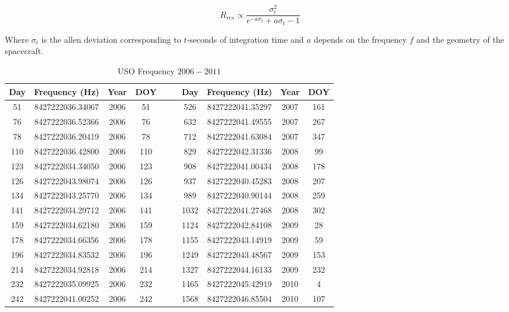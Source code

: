\documentclass{article}
\theoremstyle{mystyle}
\begin{document}
\begin{equation}
    R_{res} \propto \frac{\sigma_{t}^2}{e^{-a\sigma_{t}} +a\sigma_{t} - 1}
\end{equation}

Where $\sigma_{t}$ is the \gls{allen deviation} corresponding to $t$-seconds of integration time and $a$ depends on the frequency $f$ and the geometry of the spacecraft.


\begin{table}[H]
    \centering
    \caption{USO Frequency $2006-2011$}
    \label{tab:usr_uso_freq_vals}
    \begin{tabular}{|c c c c c | c c c c c|}
        \hline
        Day & Frequency (Hz) & Year & DOY & & &  Day & Frequency (Hz) & Year & DOY\\
         \hline
         51     & 8427222036.34067  & 2006  & 51  & & & 526  & 8427222041.35297 & 2007 & 161 \\
         76     & 8427222036.52366  & 2006  & 76  & & & 632  & 8427222041.49555 & 2007 & 267 \\
         78     & 8427222036.20419  & 2006  & 78  & & & 712  & 8427222041.63084 & 2007 & 347 \\
         110    & 8427222036.42800  & 2006  & 110 & & & 829  & 8427222042.31336 & 2008 & 99  \\
         123    & 8427222034.34050  & 2006  & 123 & & & 908  & 8427222041.00434 & 2008 & 178 \\
         126    & 8427222043.98074  & 2006  & 126 & & & 937  & 8427222040.45283 & 2008 & 207 \\
         134    & 8427222043.25770  & 2006  & 134 & & & 989  & 8427222040.90144 & 2008 & 259 \\
         141    & 8427222034.29712  & 2006  & 141 & & & 1032 & 8427222041.27468 & 2008 & 302 \\
         159    & 8427222034.62180  & 2006  & 159 & & & 1124 & 8427222042.84108 & 2009 &  28 \\
         178    & 8427222034.66356  & 2006  & 178 & & & 1155 & 8427222043.14919 & 2009 &  59 \\
         196    & 8427222034.83532  & 2006  & 196 & & & 1249 & 8427222043.48567 & 2009 & 153 \\
         214    & 8427222034.92818  & 2006  & 214 & & & 1327 & 8427222044.16133 & 2009 & 232 \\
         232    & 8427222035.09925  & 2006  & 232 & & & 1465 & 8427222045.42919 & 2010 &   4 \\
         242    & 8427222041.00252  & 2006  & 242 & & & 1568 & 8427222046.85504 & 2010 & 107 \\

\end{tabular}
\end{table}
\end{document}
